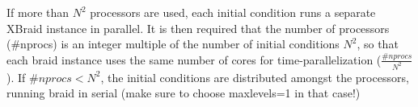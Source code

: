 \documentclass[letterpaper]{article}
\begin{document}
      If more than $N^2$ processors are used, each initial condition runs a separate XBraid instance in parallel. It is then required that the number of processors (\#nprocs) is an integer multiple of the number of initial conditions $N^2$, so that each braid instance uses the same number of cores for time-parallelization ($\frac{\#nprocs}{N^2}$). If $\#nprocs < N^2$, the initial conditions are distributed amongst the processors, running braid in serial (make sure to choose maxlevels=1 in that case!)
  
\end{document}
